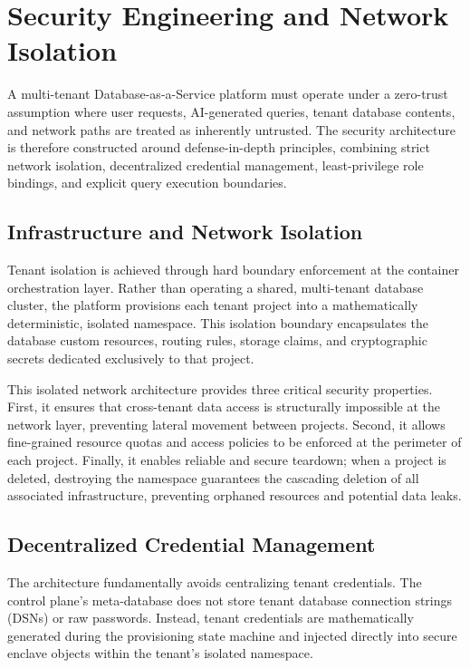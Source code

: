 \section{Security Engineering and Network Isolation}

A multi-tenant Database-as-a-Service platform must operate under a zero-trust assumption where user requests, AI-generated queries, tenant database contents, and network paths are treated as inherently untrusted. The security architecture is therefore constructed around defense-in-depth principles, combining strict network isolation, decentralized credential management, least-privilege role bindings, and explicit query execution boundaries.

\subsection{Infrastructure and Network Isolation}

Tenant isolation is achieved through hard boundary enforcement at the container orchestration layer. Rather than operating a shared, multi-tenant database cluster, the platform provisions each tenant project into a mathematically deterministic, isolated namespace. This isolation boundary encapsulates the database custom resources, routing rules, storage claims, and cryptographic secrets dedicated exclusively to that project.

This isolated network architecture provides three critical security properties. First, it ensures that cross-tenant data access is structurally impossible at the network layer, preventing lateral movement between projects. Second, it allows fine-grained resource quotas and access policies to be enforced at the perimeter of each project. Finally, it enables reliable and secure teardown; when a project is deleted, destroying the namespace guarantees the cascading deletion of all associated infrastructure, preventing orphaned resources and potential data leaks.

\subsection{Decentralized Credential Management}

The architecture fundamentally avoids centralizing tenant credentials. The control plane's meta-database does not store tenant database connection strings (DSNs) or raw passwords. Instead, tenant credentials are mathematically generated during the provisioning state machine and injected directly into secure enclave objects within the tenant's isolated namespace. 

